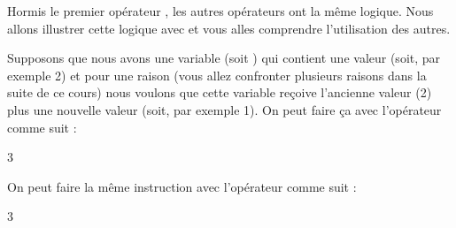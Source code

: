 \documentclass[letterpaper,10pt,french]{sphinxmanual}
\begin{document}
\sphinxAtStartPar
Hormis le premier opérateur \sphinxcode{\sphinxupquote{=}}, les autres opérateurs ont la même logique. Nous allons illustrer cette logique avec \sphinxcode{\sphinxupquote{+=}} et vous alles comprendre l’utilisation des autres.

\sphinxAtStartPar
Supposons que nous avons une variable (soit ) qui contient une valeur (soit, par exemple 2) et pour une raison (vous allez confronter plusieurs raisons dans la suite de ce cours) nous voulons que cette variable reçoive l’ancienne valeur (2) plus une nouvelle valeur (soit, par exemple 1). On peut faire ça avec l’opérateur \sphinxcode{\sphinxupquote{=}} comme suit :

\begin{sphinxVerbatim}[commandchars=\\\{\}]
  
   
\end{sphinxVerbatim}

\begin{sphinxVerbatim}[commandchars=\\\{\}]
3
\end{sphinxVerbatim}

\sphinxAtStartPar
On peut faire la même instruction avec l’opérateur \sphinxcode{\sphinxupquote{+=}} comme suit :

\begin{sphinxVerbatim}[commandchars=\\\{\}]
  
  
\end{sphinxVerbatim}

\begin{sphinxVerbatim}[commandchars=\\\{\}]
3
\end{sphinxVerbatim}
\end{document}
